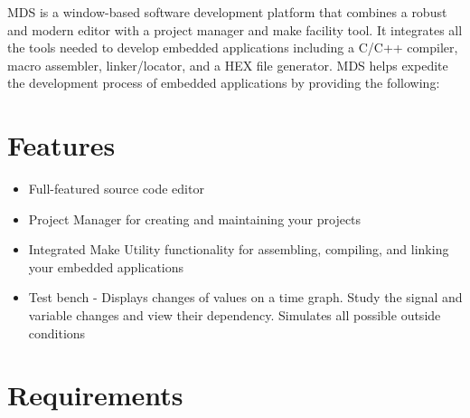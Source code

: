 
MDS is a window-based software development platform that
combines a robust and modern editor with a project manager
and make facility tool. It integrates all the tools needed
to develop embedded applications including a C/C++ compiler, macro
assembler, linker/locator, and a HEX file generator. MDS helps
expedite the development process of embedded applications by providing
the following:
        \section{Features}
                \begin{itemize}
                    \item Full-featured source code editor
                    \item Project Manager for creating and maintaining your projects
                    \item Integrated Make Utility functionality for assembling, compiling, and linking your embedded applications
                    \item Test bench - Displays changes of values on a time graph. Study the signal and variable changes and view their dependency. Simulates all possible outside conditions
                \end{itemize}

        \section{Requirements}
